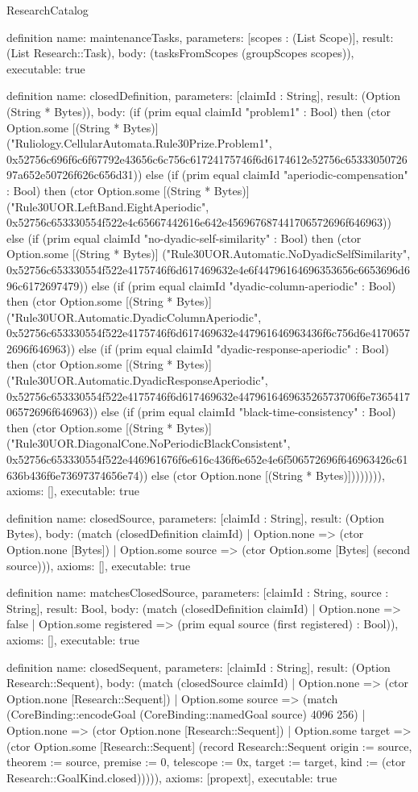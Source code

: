 \begin{lexlean}{ResearchCatalog}
\begin{semanticmodule}
definition{
  name: maintenanceTasks,
  parameters: [scopes : (List Scope)],
  result: (List Research::Task),
  body: (tasksFromScopes (groupScopes scopes)),
  executable: true
}

definition{
  name: closedDefinition,
  parameters: [claimId : String],
  result: (Option (String * Bytes)),
  body: (if (prim equal claimId "problem1" : Bool) then (ctor Option.some [(String * Bytes)] ("Ruliology.CellularAutomata.Rule30Prize.Problem1", 0x52756c696f6c6f67792e43656c6c756c61724175746f6d6174612e52756c6533305072697a652e50726f626c656d31)) else (if (prim equal claimId "aperiodic-compensation" : Bool) then (ctor Option.some [(String * Bytes)] ("Rule30UOR.LeftBand.EightAperiodic", 0x52756c653330554f522e4c65667442616e642e456967687441706572696f646963)) else (if (prim equal claimId "no-dyadic-self-similarity" : Bool) then (ctor Option.some [(String * Bytes)] ("Rule30UOR.Automatic.NoDyadicSelfSimilarity", 0x52756c653330554f522e4175746f6d617469632e4e6f44796164696353656c6653696d696c6172697479)) else (if (prim equal claimId "dyadic-column-aperiodic" : Bool) then (ctor Option.some [(String * Bytes)] ("Rule30UOR.Automatic.DyadicColumnAperiodic", 0x52756c653330554f522e4175746f6d617469632e447961646963436f6c756d6e41706572696f646963)) else (if (prim equal claimId "dyadic-response-aperiodic" : Bool) then (ctor Option.some [(String * Bytes)] ("Rule30UOR.Automatic.DyadicResponseAperiodic", 0x52756c653330554f522e4175746f6d617469632e447961646963526573706f6e736541706572696f646963)) else (if (prim equal claimId "black-time-consistency" : Bool) then (ctor Option.some [(String * Bytes)] ("Rule30UOR.DiagonalCone.NoPeriodicBlackConsistent", 0x52756c653330554f522e446961676f6e616c436f6e652e4e6f506572696f646963426c61636b436f6e73697374656e74)) else (ctor Option.none [(String * Bytes)]))))))),
  axioms: [],
  executable: true
}

definition{
  name: closedSource,
  parameters: [claimId : String],
  result: (Option Bytes),
  body: (match (closedDefinition claimId) | Option.none => (ctor Option.none [Bytes]) | Option.some source => (ctor Option.some [Bytes] (second source))),
  axioms: [],
  executable: true
}

definition{
  name: matchesClosedSource,
  parameters: [claimId : String, source : String],
  result: Bool,
  body: (match (closedDefinition claimId) | Option.none => false | Option.some registered => (prim equal source (first registered) : Bool)),
  axioms: [],
  executable: true
}

definition{
  name: closedSequent,
  parameters: [claimId : String],
  result: (Option Research::Sequent),
  body: (match (closedSource claimId) | Option.none => (ctor Option.none [Research::Sequent]) | Option.some source => (match (CoreBinding::encodeGoal (CoreBinding::namedGoal source) 4096 256) | Option.none => (ctor Option.none [Research::Sequent]) | Option.some target => (ctor Option.some [Research::Sequent] (record Research::Sequent {origin := source, theorem := source, premise := 0, telescope := 0x, target := target, kind := (ctor Research::GoalKind.closed)})))),
  axioms: [propext],
  executable: true
}


\end{semanticmodule}
\end{lexlean}
